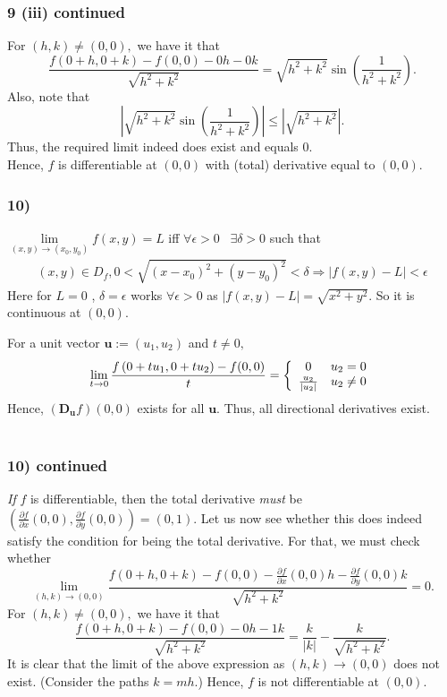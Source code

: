 \documentclass[handout]{beamer}
\begin{document}
\begin{frame}	
    \frametitle{9 (iii) continued}

	For $(h,k) \neq (0,0),$ we have it that
	\[\frac{f\left(0+h, 0+k\right)-f\left(0, 0\right)-0 h-0 k}{\sqrt{h^{2}+k^{2}}} = \sqrt{h^2 + k^2}\sin\left(\frac{1}{h^2 + k^2}\right).\]
	Also, note that
	\[\left|\sqrt{h^2 + k^2}\sin\left(\frac{1}{h^2 + k^2}\right)\right| \le \left|\sqrt{h^2 + k^2}\right|.\]
	Thus, the required limit indeed does exist and equals $0.$\\
	Hence, $f$ is differentiable at $(0,0)$ with (total) derivative equal to $(0, 0).$
\end{frame}




\begin{frame}
	\frametitle{10)}
    $\underset{(x,y)\to(x_0,y_0)}{\lim} f(x,y)=L$ iff $\forall \epsilon>0 \; \; \;  \exists \delta >0$ such that
    \begin{align*}
    (x,y)\in D_f,0<\sqrt{(x-x_0)^2+(y-y_0)^2}<\delta\Rightarrow |f(x,y)-L|<\epsilon
    \end{align*}
    Here for $L=0$ , $\delta=\epsilon$ works $\forall \epsilon>0$ as $|f(x,y)-L|=\sqrt{x^2+y^2}$. So it is continuous at $(0,0)$.

    For a unit vector $\textbf{u} := (u_1, u_2)$ and $t \neq 0,$
	\[\lim_{t \to 0} \frac{f\left(0+t u_{1}, 0+t u_{2}\right)-f(0,0)}{t} = \left\{
		\begin{array}{c c}
			0 & u_2 = 0\\
			\frac{u_2}{|u_2|} & u_2 \neq 0
		\end{array}
	\right.\]
	Hence, $\left(\mathbf{D_u} f\right)(0,0)$ exists for all $\textbf{u}.$ Thus, all directional derivatives exist.\\~\\
\end{frame}


\begin{frame}
	\frametitle{10) continued}
    \emph{If} $f$ is differentiable, then the total derivative \emph{must} be $(\frac{\partial f}{\partial x}(0, 0), \frac{\partial f}{\partial y}(0, 0)) = (0, 1).$  Let us now see whether this does indeed satisfy the condition for being the total derivative. For that, we must check whether
	\[\lim _{(h, k) \rightarrow(0,0)} \frac{f\left(0+h, 0+k\right)-f\left(0, 0\right)-\frac{\partial f}{\partial x}(0,0) h-\frac{\partial f}{\partial y}(0,0) k}{\sqrt{h^{2}+k^{2}}}=0.\]
	For $(h,k) \neq (0,0),$ we have it that
	\[\frac{f\left(0+h, 0+k\right)-f\left(0, 0\right)-0 h- 1k}{\sqrt{h^{2}+k^{2}}} = \frac{k}{|k|} - \dfrac{k}{\sqrt{h^2 + k^2}}.\]
	It is clear that the limit of the above expression as $(h, k) \to (0, 0)$ does not exist. (Consider the paths $k = mh.$) Hence, $f$ is not differentiable at $(0, 0).$
\end{frame}

\end{document}
